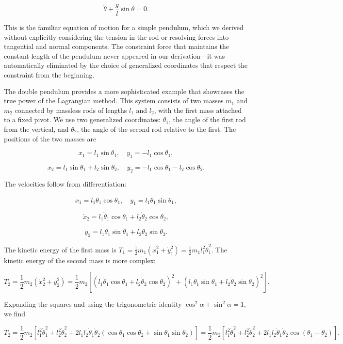 $$\ddot{\theta} + \frac{g}{l} \sin \theta = 0.$$

This is the familiar equation of motion for a simple pendulum, which we derived without explicitly considering the tension in the rod or resolving forces into tangential and normal components. The constraint force that maintains the constant length of the pendulum never appeared in our derivation—it was automatically eliminated by the choice of generalized coordinates that respect the constraint from the beginning.

The double pendulum provides a more sophisticated example that showcases the true power of the Lagrangian method. This system consists of two masses $m_1$ and $m_2$ connected by massless rods of lengths $l_1$ and $l_2$, with the first mass attached to a fixed pivot. We use two generalized coordinates: $\theta_1$, the angle of the first rod from the vertical, and $\theta_2$, the angle of the second rod relative to the first. The positions of the two masses are

$$x_1 = l_1 \sin \theta_1, \quad y_1 = -l_1 \cos \theta_1,$$

$$x_2 = l_1 \sin \theta_1 + l_2 \sin \theta_2, \quad y_2 = -l_1 \cos \theta_1 - l_2 \cos \theta_2.$$

The velocities follow from differentiation:

$$\dot{x}_1 = l_1 \dot{\theta}_1 \cos \theta_1, \quad \dot{y}_1 = l_1 \dot{\theta}_1 \sin \theta_1,$$

$$\dot{x}_2 = l_1 \dot{\theta}_1 \cos \theta_1 + l_2 \dot{\theta}_2 \cos \theta_2,$$

$$\dot{y}_2 = l_1 \dot{\theta}_1 \sin \theta_1 + l_2 \dot{\theta}_2 \sin \theta_2.$$

The kinetic energy of the first mass is $T_1 = \frac{1}{2} m_1 (\dot{x}_1^2 + \dot{y}_1^2) = \frac{1}{2} m_1 l_1^2 \dot{\theta}_1^2$. The kinetic energy of the second mass is more complex:

$$T_2 = \frac{1}{2} m_2 (\dot{x}_2^2 + \dot{y}_2^2) = \frac{1}{2} m_2 \left[ (l_1 \dot{\theta}_1 \cos \theta_1 + l_2 \dot{\theta}_2 \cos \theta_2)^2 + (l_1 \dot{\theta}_1 \sin \theta_1 + l_2 \dot{\theta}_2 \sin \theta_2)^2 \right].$$

Expanding the squares and using the trigonometric identity $\cos^2 \alpha + \sin^2 \alpha = 1$, we find

$$T_2 = \frac{1}{2} m_2 \left[ l_1^2 \dot{\theta}_1^2 + l_2^2 \dot{\theta}_2^2 + 2 l_1 l_2 \dot{\theta}_1 \dot{\theta}_2 (\cos \theta_1 \cos \theta_2 + \sin \theta_1 \sin \theta_2) \right] = \frac{1}{2} m_2 \left[ l_1^2 \dot{\theta}_1^2 + l_2^2 \dot{\theta}_2^2 + 2 l_1 l_2 \dot{\theta}_1 \dot{\theta}_2 \cos(\theta_1 - \theta_2) \right].$$

